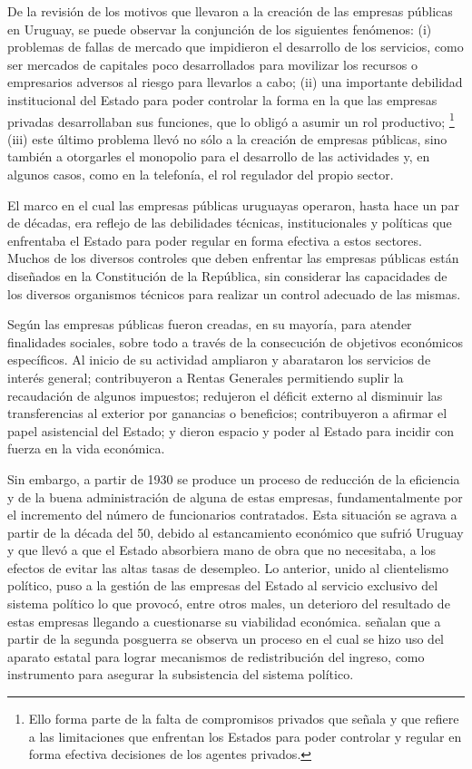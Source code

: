 \documentclass[
  12pt,
  spanish,
]{book}
\begin{document}
De la revisión de los motivos que llevaron a la creación de las empresas
públicas en Uruguay, se puede observar la conjunción de los siguientes
fenómenos: (i) problemas de fallas de mercado que impidieron el
desarrollo de los servicios, como ser mercados de capitales poco
desarrollados para movilizar los recursos o empresarios adversos al
riesgo para llevarlos a cabo; (ii) una importante debilidad
institucional del Estado para poder controlar la forma en la que las
empresas privadas desarrollaban sus funciones, que lo obligó a asumir un
rol productivo; \footnote{Ello forma parte de la falta de compromisos
  privados que señala \citet{Perotti2004} y que refiere a las
  limitaciones que enfrentan los Estados para poder controlar y regular
  en forma efectiva decisiones de los agentes privados.} (iii) este
último problema llevó no sólo a la creación de empresas públicas, sino
también a otorgarles el monopolio para el desarrollo de las actividades
y, en algunos casos, como en la telefonía, el rol regulador del propio
sector.

El marco en el cual las empresas públicas uruguayas operaron, hasta hace
un par de décadas, era reflejo de las debilidades técnicas,
institucionales y políticas que enfrentaba el Estado para poder regular
en forma efectiva a estos sectores. Muchos de los diversos controles que
deben enfrentar las empresas públicas están diseñados en la Constitución
de la República, sin considerar las capacidades de los diversos
organismos técnicos para realizar un control adecuado de las mismas.

Según \citet{Nahum1993} las empresas públicas fueron creadas, en su
mayoría, para atender finalidades sociales, sobre todo a través de la
consecución de objetivos económicos específicos. Al inicio de su
actividad ampliaron y abarataron los servicios de interés general;
contribuyeron a Rentas Generales permitiendo suplir la recaudación de
algunos impuestos; redujeron el déficit externo al disminuir las
transferencias al exterior por ganancias o beneficios; contribuyeron a
afirmar el papel asistencial del Estado; y dieron espacio y poder al
Estado para incidir con fuerza en la vida económica.

Sin embargo, a partir de 1930 se produce un proceso de reducción de la
eficiencia y de la buena administración de alguna de estas empresas,
fundamentalmente por el incremento del número de funcionarios
contratados. Esta situación se agrava a partir de la década del 50,
debido al estancamiento económico que sufrió Uruguay y que llevó a que
el Estado absorbiera mano de obra que no necesitaba, a los efectos de
evitar las altas tasas de desempleo. Lo anterior, unido al clientelismo
político, puso a la gestión de las empresas del Estado al servicio
exclusivo del sistema político lo que provocó, entre otros males, un
deterioro del resultado de estas empresas llegando a cuestionarse su
viabilidad económica. \citet{Solari1983} señalan que a partir de la
segunda posguerra se observa un proceso en el cual se hizo uso del
aparato estatal para lograr mecanismos de redistribución del ingreso,
como instrumento para asegurar la subsistencia del sistema político.
\end{document}
